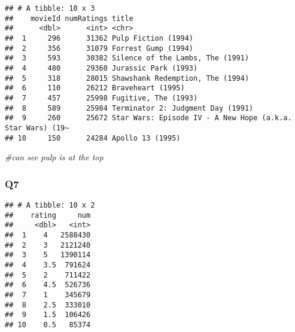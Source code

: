 \documentclass[
]{article}
\newenvironment{Shaded}{\begin{snugshade}}{\end{snugshade}}
\newcommand{\CommentTok}[1]{\textcolor[rgb]{0.56,0.35,0.01}{\textit{#1}}}
\newcommand{\DataTypeTok}[1]{\textcolor[rgb]{0.13,0.29,0.53}{#1}}
\newcommand{\KeywordTok}[1]{\textcolor[rgb]{0.13,0.29,0.53}{\textbf{#1}}}
\newcommand{\NormalTok}[1]{#1}
\newcommand{\OperatorTok}[1]{\textcolor[rgb]{0.81,0.36,0.00}{\textbf{#1}}}
\newcommand{\StringTok}[1]{\textcolor[rgb]{0.31,0.60,0.02}{#1}}
\begin{document}
\begin{verbatim}
## # A tibble: 10 x 3
##    movieId numRatings title                                                     
##      <dbl>      <int> <chr>                                                     
##  1     296      31362 Pulp Fiction (1994)                                       
##  2     356      31079 Forrest Gump (1994)                                       
##  3     593      30382 Silence of the Lambs, The (1991)                          
##  4     480      29360 Jurassic Park (1993)                                      
##  5     318      28015 Shawshank Redemption, The (1994)                          
##  6     110      26212 Braveheart (1995)                                         
##  7     457      25998 Fugitive, The (1993)                                      
##  8     589      25984 Terminator 2: Judgment Day (1991)                         
##  9     260      25672 Star Wars: Episode IV - A New Hope (a.k.a. Star Wars) (19~
## 10     150      24284 Apollo 13 (1995)
\end{verbatim}

\begin{Shaded}
\begin{Highlighting}[]
\CommentTok{#can see pulp is at the top }
\end{Highlighting}
\end{Shaded}

\hypertarget{q7}{%
\subsubsection{Q7}\label{q7}}

\begin{Shaded}
\end{Shaded}

\begin{verbatim}
## # A tibble: 10 x 2
##    rating     num
##     <dbl>   <int>
##  1    4   2588430
##  2    3   2121240
##  3    5   1390114
##  4    3.5  791624
##  5    2    711422
##  6    4.5  526736
##  7    1    345679
##  8    2.5  333010
##  9    1.5  106426
## 10    0.5   85374
\end{verbatim}
\end{document}
